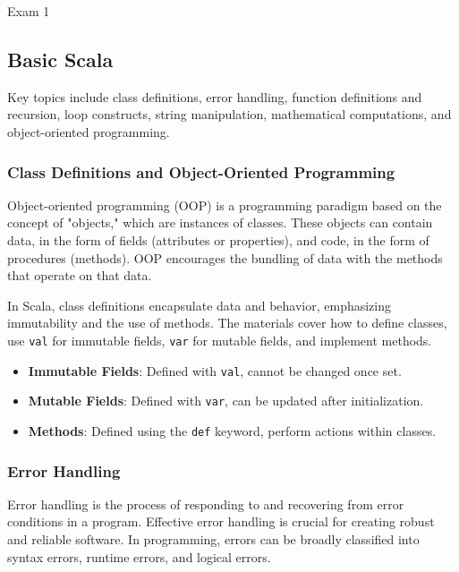 \begin{examnotes}{Exam 1}
    \subsection*{Basic Scala}

    Key topics include class definitions, error handling, function definitions and recursion, loop constructs, string manipulation, mathematical computations, and object-oriented programming.
    
    \subsubsection*{Class Definitions and Object-Oriented Programming}
    
    Object-oriented programming (OOP) is a programming paradigm based on the concept of "objects," which are instances of classes. These objects can contain data, in the form of fields (attributes 
    or properties), and code, in the form of procedures (methods). OOP encourages the bundling of data with the methods that operate on that data.
    
    \begin{highlight}
        In Scala, class definitions encapsulate data and behavior, emphasizing immutability and the use of methods. The materials cover how to define classes, use \texttt{val} for immutable 
        fields, \texttt{var} for mutable fields, and implement methods.
    
        \begin{itemize}
            \item \textbf{Immutable Fields}: Defined with \texttt{val}, cannot be changed once set.
            \item \textbf{Mutable Fields}: Defined with \texttt{var}, can be updated after initialization.
            \item \textbf{Methods}: Defined using the \texttt{def} keyword, perform actions within classes.
        \end{itemize}
    \end{highlight}
    
    \subsubsection*{Error Handling}
    
    Error handling is the process of responding to and recovering from error conditions in a program. Effective error handling is crucial for creating robust and reliable software. In programming, 
    errors can be broadly classified into syntax errors, runtime errors, and logical errors.
    

\end{examnotes}
